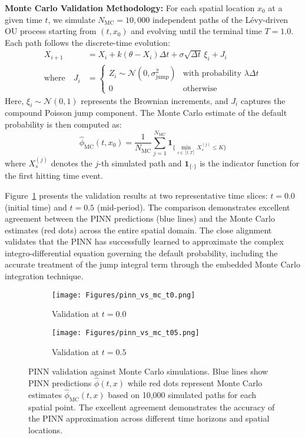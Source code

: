 \documentclass[11pt,twoside,openright]{report}
\begin{document}
\textbf{Monte Carlo Validation Methodology:} For each spatial location $x_0$ at a given time $t$, we simulate $N_{\text{MC}} = 10,000$ independent paths of the Lévy-driven OU process starting from $(t, x_0)$ and evolving until the terminal time $T = 1.0$. Each path follows the discrete-time evolution:
\begin{align}
X_{i+1} &= X_i + k(\theta - X_i)\Delta t + \sigma \sqrt{\Delta t} \, \xi_i + J_i \\
\text{where} \quad J_i &= \begin{cases} 
Z_i \sim \mathcal{N}(0, \sigma_{\text{jump}}^2) & \text{with probability } \lambda \Delta t \\
0 & \text{otherwise}
\end{cases}
\end{align}
Here, $\xi_i \sim \mathcal{N}(0,1)$ represents the Brownian increments, and $J_i$ captures the compound Poisson jump component. The Monte Carlo estimate of the default probability is then computed as:
$$
\hat{\phi}_{\text{MC}}(t, x_0) = \frac{1}{N_{\text{MC}}} \sum_{j=1}^{N_{\text{MC}}} \mathbf{1}_{\{\min_{s \in [t,T]} X_s^{(j)} \leq K\}}
$$
where $X_s^{(j)}$ denotes the $j$-th simulated path and $\mathbf{1}_{\{\cdot\}}$ is the indicator function for the first hitting time event.

Figure~\ref{fig:pinn_mc_comparison} presents the validation results at two representative time slices: $t = 0.0$ (initial time) and $t = 0.5$ (mid-period). The comparison demonstrates excellent agreement between the PINN predictions (blue lines) and the Monte Carlo estimates (red dots) across the entire spatial domain. The close alignment validates that the PINN has successfully learned to approximate the complex integro-differential equation governing the default probability, including the accurate treatment of the jump integral term through the embedded Monte Carlo integration technique.

\begin{figure}[htbp]
    \centering
    \begin{subfigure}[b]{0.8\textwidth}
        \texttt{[image: Figures/pinn\_vs\_mc\_t0.png]}
        \caption{Validation at $t = 0.0$}
    \end{subfigure}
    \hfill
    \begin{subfigure}[b]{0.8\textwidth}
        \texttt{[image: Figures/pinn\_vs\_mc\_t05.png]}
        \caption{Validation at $t = 0.5$}
    \end{subfigure}
    \caption{PINN validation against Monte Carlo simulations. Blue lines show PINN predictions $\hat{\phi}(t,x)$ while red dots represent Monte Carlo estimates $\hat{\phi}_{\text{MC}}(t,x)$ based on 10,000 simulated paths for each spatial point. The excellent agreement demonstrates the accuracy of the PINN approximation across different time horizons and spatial locations.}
    \label{fig:pinn_mc_comparison}
\end{figure}
\end{document}
